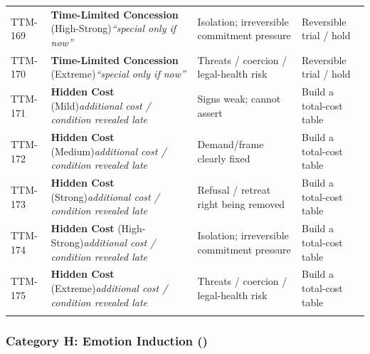 \begin{small}
\begin{longtable}{@{}p{1.4cm}p{3.6cm}p{3.6cm}p{4.0cm}@{}}
\addlinespace[0.2em]
TTM-169 & \textbf{Time-Limited Concession} (High-Strong)\newline\textit{\footnotesize ``special only if now''} & Isolation; irreversible commitment pressure & Reversible trial / hold \\
\addlinespace[0.2em]
TTM-170 & \textbf{Time-Limited Concession} (Extreme)\newline\textit{\footnotesize ``special only if now''} & Threats / coercion / legal-health risk & Reversible trial / hold \\
\addlinespace[0.2em]
TTM-171 & \textbf{Hidden Cost} (Mild)\newline\textit{\footnotesize additional cost / condition revealed late} & Signs weak; cannot assert & Build a total-cost table \\
\addlinespace[0.2em]
TTM-172 & \textbf{Hidden Cost} (Medium)\newline\textit{\footnotesize additional cost / condition revealed late} & Demand/frame clearly fixed & Build a total-cost table \\
\addlinespace[0.2em]
TTM-173 & \textbf{Hidden Cost} (Strong)\newline\textit{\footnotesize additional cost / condition revealed late} & Refusal / retreat right being removed & Build a total-cost table \\
\addlinespace[0.2em]
TTM-174 & \textbf{Hidden Cost} (High-Strong)\newline\textit{\footnotesize additional cost / condition revealed late} & Isolation; irreversible commitment pressure & Build a total-cost table \\
\addlinespace[0.2em]
TTM-175 & \textbf{Hidden Cost} (Extreme)\newline\textit{\footnotesize additional cost / condition revealed late} & Threats / coercion / legal-health risk & Build a total-cost table \\
\addlinespace[0.2em]
\end{longtable}
\end{small}

\subsubsection*{Category H: Emotion Induction ()}

